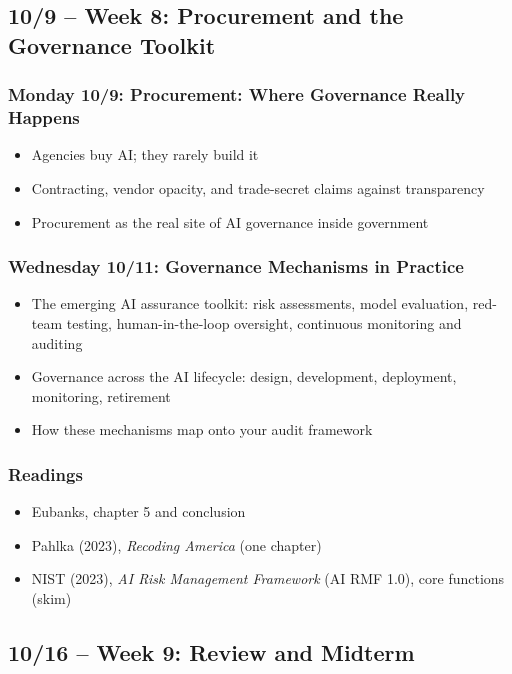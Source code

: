 \documentclass[12pt]{article}
\begin{document}
\subsection*{10/9 -- Week 8: Procurement and the Governance Toolkit}
    \subsubsection*{Monday 10/9: Procurement: Where Governance Really Happens}
        \begin{itemize}
            \item Agencies buy AI; they rarely build it
            \item Contracting, vendor opacity, and trade-secret claims against transparency
            \item Procurement as the real site of AI governance inside government
        \end{itemize}
    \subsubsection*{Wednesday 10/11: Governance Mechanisms in Practice}
        \begin{itemize}
            \item The emerging AI assurance toolkit: risk assessments, model evaluation, red-team testing, human-in-the-loop oversight, continuous monitoring and auditing
            \item Governance across the AI lifecycle: design, development, deployment, monitoring, retirement
            \item How these mechanisms map onto your audit framework
        \end{itemize}
    \subsubsection*{Readings}
        \begin{itemize}
            \item Eubanks, chapter 5 and conclusion
            \item Pahlka (2023), \emph{Recoding America} (one chapter)
            \item NIST (2023), \emph{AI Risk Management Framework} (AI RMF 1.0), core functions (skim)
        \end{itemize}

\subsection*{10/16 -- Week 9: Review and Midterm}
\end{document}
